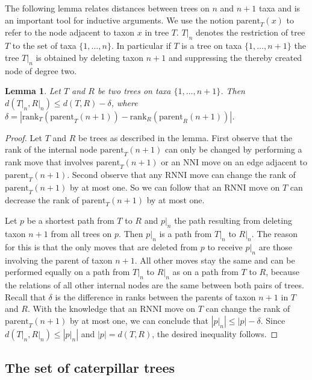 \documentclass{amsart}
\newcommand{\parent}{\mathrm{parent}}
\newcommand{\rank}{\mathrm{rank}}
\newcommand{\nni}{\mathrm{NNI}}
\newcommand{\rnni}{\mathrm{RNNI}}
\newtheorem{lemma}[definition]{Lemma}
\begin{document}
The following lemma relates distances between trees on $n$ and $n+1$ taxa and is an important tool for inductive arguments.
We use the notion $\parent_T(x)$ to refer to the node adjacent to taxon $x$ in tree $T$.
$T{\big|}_n$ denotes the restriction of tree $T$ to the set of taxa $\{1, \ldots, n\}$.
In particular if $T$ is a tree on taxa $\{1, \ldots, n+1\}$ the tree $T{\big|}_n$ is obtained by deleting taxon $n+1$ and suppressing the thereby created node of degree two.

\begin{lemma}
Let $T$ and $R$ be two trees on taxa $\{1, \ldots, n+1\}$.
Then $d(T{\big|}_n, R{\big|}_n) \leq d(T,R) - \delta$, where $\delta = |\rank_T(\parent_T(n+1)) - \rank_R(\parent_R(n+1))|$.
\label{lemma:distance_delete_taxon}
\end{lemma}

\begin{proof}
Let $T$ and $R$ be trees as described in the lemma.
First observe that the rank of the internal node $\parent_T(n+1)$ can only be changed by performing a rank move that involves $\parent_T(n+1)$ or an $\nni$ move on an edge adjacent to $\parent_T(n+1)$.
Second observe that any $\rnni$ move can change the rank of $\parent_T(n+1)$ by at most one.
So we can follow that an $\rnni$ move on $T$ can decrease the rank of $\parent_T(n+1)$ by at most one.

Let $p$ be a shortest path from $T$ to $R$ and $p{\big|}_n$ the path resulting from deleting taxon $n+1$ from all trees on $p$.
Then $p{\big|}_n$ is a path from $T{\big|}_n$ to $R{\big|}_n$.
The reason for this is that the only moves that are deleted from $p$ to receive $p{\big|}_n$ are those involving the parent of taxon $n+1$.
All other moves stay the same and can be performed equally on a path from $T{\big|}_n$ to $R{\big|}_n$ as on a path from $T$ to $R$, because the relations of all other internal nodes are the same between both pairs of trees.
Recall that $\delta$ is the difference in ranks between the parents of taxon $n+1$ in $T$ and $R$.
With the knowledge that an $\rnni$ move on $T$ can change the rank of $\parent_T(n+1)$ by at most one, we can conclude that $|p{\big|}_n| \leq |p| - \delta$.
Since $d(T{\big|}_n,R{\big|}_n) \leq |p{\big|}_n|$ and $|p| = d(T,R)$, the desired inequality follows.
\end{proof}


\subsection{The set of caterpillar trees}
\label{section:caterpillar_convex}
\end{document}

